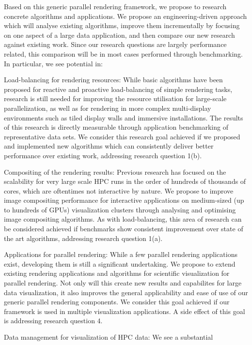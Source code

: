 Based on this generic parallel rendering framework, we propose to research
concrete algorithms and applications. We propose an engineering-driven approach
which will analyse existing algorithms, improve them incrementally by focusing
on one aspect of a large data application, and then compare our new research
against existing work. Since our research questions are largely performance
related, this comparison will be in most cases performed through benchmarking.
In particular, we see potential in:
%
\begin{compactdesc}
\item [Load-balancing for rendering resources:] While basic algorithms have been
proposed for reactive and proactive load-balancing of simple rendering tasks,
research is still needed for improving the resource utilisation for large-scale
parallelization, as well as for rendering in more complex multi-display
environments such as tiled display walls and immersive installations. The
results of this research is directly measurable through application benchmarking
of representative data sets. We consider this research goal achieved if we
proposed and implemented new algorithms which can consistently deliver better
performance over existing work, addressing research question 1(b).
\item [Compositing of the rendering results:] Previous research has focused on
the scalability for very large scale HPC runs in the order of hundreds of
thousands of cores, which are oftentimes not interactive by nature. We propose
to improve image compositing performance for interactive applications on
medium-sized (up to hundreds of GPUs) visualization clusters through analysing
and optimising image compositing algorithms. As with load-balancing, this area
of research can be considered achieved if benchmarks show consistent improvement
over state of the art algorithms, addressing research question 1(a).
\item [Applications for parallel rendering:] While a few parallel rendering
applications exist, developing them is still a significant undertaking. We
propose to extend existing rendering applications and algorithms for scientific
visualization for parallel rendering. Not only will this create new results and
capabilites for large data visualization, it also improves the general
applicability and ease of use of our generic parallel rendering components. We
consider this goal achieved if our framework is used in multiple visualization
applications. A side effect of this goal is addressing research question 4.
\item [Data management for visualization of HPC data:] We see a substantial

\end{compactdesc}
